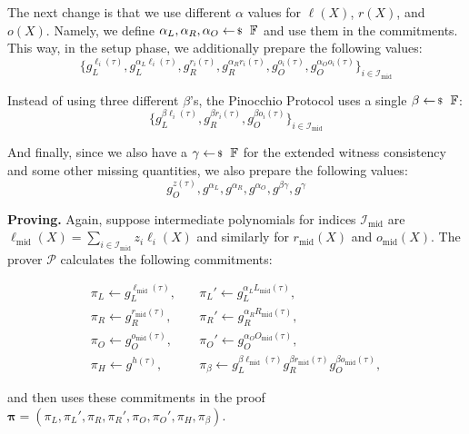 \documentclass[../lecture-notes-148x210.tex]{subfiles}
\begin{document}
The next change is that we use different $\alpha$ values for $\ell(X)$, $r(X)$, and $o(X)$. Namely, we define $\alpha_L,\alpha_R,\alpha_O \leftarrowS \mathbb{F}$ and use them in the commitments. This way, in the setup phase, we additionally prepare the following values:
\begin{equation*}
    \{g_L^{\ell_i(\tau)}, g_L^{\alpha_L\ell_i(\tau)}, g_R^{r_i(\tau)}, g_R^{\alpha_Rr_i(\tau)}, g_O^{o_i(\tau)}, g_O^{\alpha_O o_i(\tau)}\}_{i \in \mathcal{I}_{\text{mid}}}
\end{equation*}

Instead of using three different $\beta$'s, the Pinocchio Protocol uses a single $\beta \leftarrowS \mathbb{F}$:
\begin{equation*}
    \{g_L^{\beta \ell_i(\tau)}, g_R^{\beta r_i(\tau)},g_O^{\beta o_i(\tau)} \}_{i \in \mathcal{I}_{\text{mid}}}
\end{equation*}

And finally, since we also have a $\gamma \leftarrowS \mathbb{F}$ for the extended witness consistency and some other missing quantities, we also prepare the following values:
\begin{equation*}
    g_O^{z(\tau)}, g^{\alpha_L}, g^{\alpha_R}, g^{\alpha_O},g^{\beta\gamma}, g^{\gamma}
\end{equation*}

\textcolor{green!50!black}{\textbf{Proving.}} Again, suppose intermediate polynomials for indices $\mathcal{I}_{\text{mid}}$ are $\ell_{\text{mid}}(X) = \sum_{i \in \mathcal{I}_{\text{mid}}}z_i\ell_i(X)$ and similarly for $r_{\text{mid}}(X)$ and $o_{\text{mid}}(X)$. The prover $\mathcal{P}$ calculates the following commitments:

\begin{align*}
    \pi_L \gets g_L^{\ell_{\text{mid}}(\tau)}, & \quad \pi_L' \gets g_L^{\alpha_LL_{\text{mid}}(\tau)}, \\
    \pi_R \gets g_R^{r_{\text{mid}}(\tau)}, & \quad \pi_R' \gets g_R^{\alpha_RR_{\text{mid}}(\tau)}, \\
    \pi_O \gets g_O^{o_{\text{mid}}(\tau)}, & \quad \pi_O' \gets g_O^{\alpha_OO_{\text{mid}}(\tau)}, \\
    \pi_H \gets g^{h(\tau)}, & \quad \pi_{\beta} \gets g_L^{\beta \ell_{\text{mid}}(\tau)}g_R^{\beta r_{\text{mid}}(\tau)}g_O^{\beta o_{\text{mid}}(\tau)},
\end{align*}

and then uses these commitments in the proof $\boldsymbol{\pi} = (\pi_L,\pi_L',\pi_R,\pi_R',\pi_O,\pi_O',\pi_H,\pi_{\beta})$.
\end{document}
